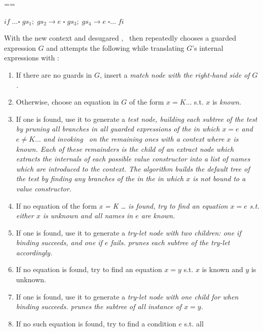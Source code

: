 \documentclass[manuscript,screen,review, 12pt, nonacm]{acmart}
\begin{document}
    
    ==
    
    ${if\; \dots \square\; gs_{1};\; gs_{2} \rightarrow e \;\square\; gs_{3};\; gs_{4} \rightarrow e \;\square \dots \;fi}$


    With the new context and desugared \iffibf, \Compile\ then repeatedly
    chooses a guarded expression $G$ and attempts the following while
    translating $G$'s internal expressions with \DTran: 

    \begin{enumerate}
        \item If there are no guards in $G$, insert a \it{match} node with the
        right-hand side of $G$. 
        \item Otherwise, choose an equation in $G$ of the form $x = K \dots$
        s.t. $x$ is \it{known}. 
        \item If one is found, use it to generate a \it{test} node, building
        each subtree of the \it{test} by pruning all branches in \it{all}
        guarded expressions of the \iffibf in which $x = e$ and $e \neq K
        \dots$ and invoking \Compile\ on the remaining ones with a context where
        $x$ is known. Each of these remainders is the child of an \it{extract}
        node which extracts the internals of each possible value constructor
        into a list of names which are introduced to the context. The algorithm
        builds the default tree of the \it{test} by finding any branches of the
        in the \iffibf in which $x$ is not bound to a value constructor. 
        \item If no equation of the form \it{x = K \dots} is found, try to find
        an equation $x = e$ s.t. either $x$ is unknown and all names in $e$ are
        known. 
        \item If one is found, use it to generate a \it{try-let} node with two
        children: one if binding succeeds, and one if $e$ fails. \Compile prunes
        each subtree of the \it{try-let} accordingly.
        \item If no equation is found, try to find an equation $x = y$ s.t. $x$
        is known and $y$ is unknown. 
        \item If one is found, use it to generate a \it{try-let} node with one
        child for when binding succeeds. \Compile prunes the subtree of all 
        instance of $x = y$. 
        \item If no such equation is found, try to find a condition $e$ s.t. all

\end{enumerate}
\end{document}

